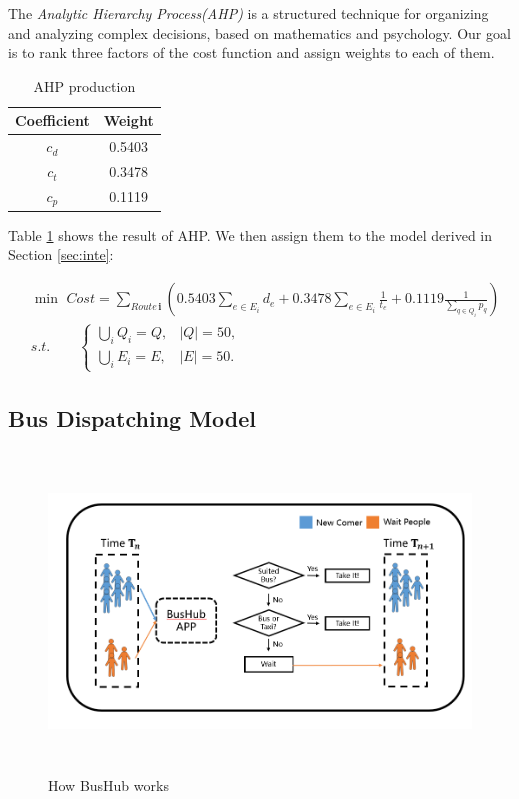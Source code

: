\documentclass{mcmthesis}
\begin{document}
The \emph{Analytic Hierarchy Process(AHP)} is a structured technique for organizing and analyzing complex decisions, based on mathematics and psychology. Our goal is to rank three factors of the cost function and assign weights to each of them.

\begin{table}[h]
    \centering
    \caption{AHP production}
    \label{tab:AHP}
    \linespread{1.5}
    \begin{tabular}{c c}
\hline
    	Coefficient & Weight\\
\hline
	$c_d$ & 0.5403\\
	$c_t$ & 0.3478\\
	$c_p$ & 0.1119\\
\hline
    \end{tabular}
\end{table}

Table \ref{tab:AHP} shows the result of AHP. We then assign them to the model derived in Section \ref{sec:inte}:

\begin{equation}
\begin{aligned}	
    & \min\,\, Cost = \sum\limits_{Route\,\textbf{i}}(0.5403 \sum\limits_{e\in E_i} d_e + 0.3478 \sum\limits_{e\in E_i} \frac{1}{t_e} + 0.1119 \frac{1}{\sum\limits_{q\in Q_i} p_q})\\
    & s.t. \qquad
    \begin{cases}
    \bigcup\limits_{i}Q_i = Q, & |Q| = 50,\\
    \bigcup\limits_{i}E_i = E, & |E| = 50.
    \end{cases}
\end{aligned}
\end{equation}

\subsection{Bus Dispatching Model}

\begin{figure}[htbp]
    \centering
    \includegraphics[height=8.5cm,width=16cm]{figures/APP.png}
    \caption{How BusHub works}
    \label{fig:BusHub}
\end{figure}
\end{document}
